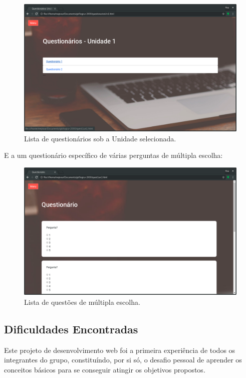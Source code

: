 \documentclass[11pt, a4paper]{article}
\begin{document}
				\begin{figure}[!h]
					\centering
					\includegraphics[scale=.32]{print9.png}
					\caption{Lista de questionários sob a Unidade selecionada.}
				\end{figure}

			E a um questionário específico de várias perguntas de múltipla escolha:

				\begin{figure}[!h]
					\centering
					\includegraphics[scale=.32]{print10.png}
					\caption{Lista de questões de múltipla escolha.}
				\end{figure}

		\subsection{Dificuldades Encontradas}

			Este projeto de desenvolvimento web foi a primeira experiência de todos os integrantes do grupo, constituíndo, por si só, o desafio pessoal de aprender os conceitos básicos para se conseguir atingir os objetivos propostos.\\
\end{document}

